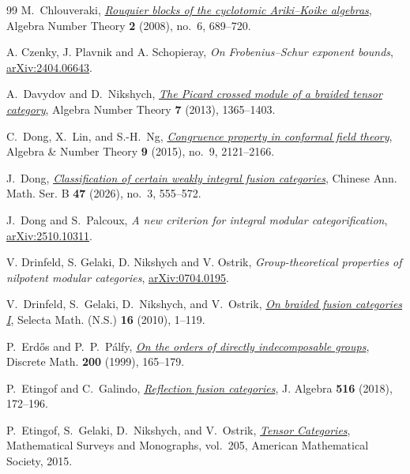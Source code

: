 \documentclass[11pt,a4paper]{article}
\numberwithin{equation}{section}
\theoremstyle{remark}
\begin{document}
\begin{thebibliography}{99}
M.~Chlouveraki, \href{https://doi.org/10.2140/ant.2008.2.689}{\emph{Rouquier blocks of the cyclotomic Ariki--Koike algebras}}, Algebra Number Theory \textbf{2} (2008), no.~6, 689--720.

A. Czenky, J. Plavnik and A. Schopieray, \emph{On Frobenius--Schur exponent bounds}, \href{https://arxiv.org/abs/2404.06643}{arXiv:2404.06643}.

A.~Davydov and D.~Nikshych, \href{https://doi.org/10.2140/ant.2013.7.1365}{\emph{The Picard crossed module of a braided
tensor category}}, Algebra Number Theory \textbf{7} (2013), 1365--1403.

C.~Dong, X.~Lin, and S.-H.~Ng,
\href{https://doi.org/10.2140/ant.2015.9.2121}{\emph{Congruence property in conformal field theory}},
Algebra \& Number Theory \textbf{9} (2015), no.~9, 2121--2166.

J.~Dong,
\href{https://doi.org/10.1007/s11401-026-0019-6}{\emph{Classification of certain weakly integral fusion categories}},
Chinese Ann. Math. Ser. B \textbf{47} (2026), no.~3,
555--572.

J.~Dong and S.~Palcoux, \emph{A new criterion for integral modular
categorification}, \href{https://arxiv.org/abs/2510.10311}{arXiv:2510.10311}.

V. Drinfeld, S. Gelaki, D. Nikshych and V. Ostrik,
\emph{Group-theoretical properties of nilpotent modular categories},
\href{https://arxiv.org/abs/0704.0195}{arXiv:0704.0195}.

V.~Drinfeld, S.~Gelaki, D.~Nikshych, and V.~Ostrik,
\href{https://doi.org/10.1007/s00029-010-0017-z}{\emph{On braided fusion categories I}},
Selecta Math. (N.S.) \textbf{16} (2010), 1--119.

P.~Erd\H{o}s and P.~P.~P\'alfy, \href{https://doi.org/10.1016/S0012-365X(98)00325-2}{\emph{On the orders of directly
indecomposable groups}}, Discrete Math. \textbf{200} (1999), 165--179.

P.~Etingof and C.~Galindo,
\href{https://doi.org/10.1016/j.jalgebra.2018.09.006}{\emph{Reflection fusion categories}},
J. Algebra \textbf{516} (2018), 172--196.

P.~Etingof, S.~Gelaki, D.~Nikshych, and V.~Ostrik,
\href{https://math.mit.edu/~etingof/egnobookfinal.pdf}{\emph{Tensor Categories}},
Mathematical Surveys and Monographs, vol.~205,
American Mathematical Society, 2015.


\end{thebibliography}
\end{document}
